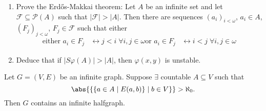 \documentclass{article}
\begin{document}
\begin{ex}\leavevmode
  \begin{enumerate}[label=(\roman*)]
    \item Prove the Erd\H{o}s-Makkai theorem:
      Let $A$ be an infinite set and let $\mathcal{F} \subseteq \mathcal{P}(A)$ such that $|\mathcal{F}| > |A|$. Then there are sequences $(a_i)_{i < \omega}$, $a_i \in A$, $(F_j)_{j < \omega}$, $F_j \in \mathcal{F}$ such that either
      \begin{align*}
        \text{either }a_i \in F_j &\leftrightarrow j < i \; \forall i,j \in \omega
        \text{or }a_i \in F_j &\leftrightarrow i < j \; \forall i,j \in \omega
      \end{align*}
    \item Deduce that if $|S\varphi(A)| > |A|$, then $\varphi(x,y)$ is unstable.
  \end{enumerate}
\end{ex}
\begin{thm}
  Let $G = (V,E)$ be an infinite graph. Suppose $\exists$ countable $A \subseteq V$ such that
  \begin{equation*}
    \abs{\{\{a \in A \mid E(a,b)\} \mid b \in V\}} > \aleph_0.
  \end{equation*}
  Then $G$ contains an infinite halfgraph.
\end{thm}
\end{document}
